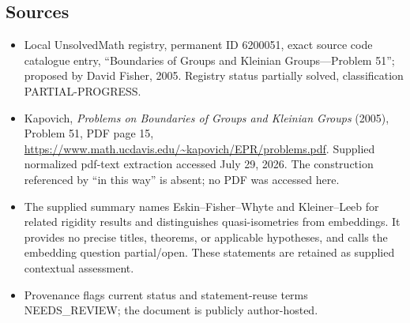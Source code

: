 \documentclass[11pt]{article}
\begin{document}
\subsection{Sources}
\begin{itemize}
\item Local UnsolvedMath registry, permanent ID 6200051, exact source code catalogue entry, ``Boundaries of Groups and Kleinian Groups---Problem 51''; proposed by David Fisher, 2005. Registry status partially solved, classification PARTIAL-PROGRESS.
\item Kapovich, \emph{Problems on Boundaries of Groups and Kleinian Groups} (2005), Problem 51, PDF page 15, \url{https://www.math.ucdavis.edu/~kapovich/EPR/problems.pdf}. Supplied normalized pdf-text extraction accessed July 29, 2026. The construction referenced by ``in this way'' is absent; no PDF was accessed here.
\item The supplied summary names Eskin--Fisher--Whyte and Kleiner--Leeb for related rigidity results and distinguishes quasi-isometries from embeddings. It provides no precise titles, theorems, or applicable hypotheses, and calls the embedding question partial/open. These statements are retained as supplied contextual assessment.
\item Provenance flags current status and statement-reuse terms NEEDS\_REVIEW; the document is publicly author-hosted.
\end{itemize}
\end{document}
